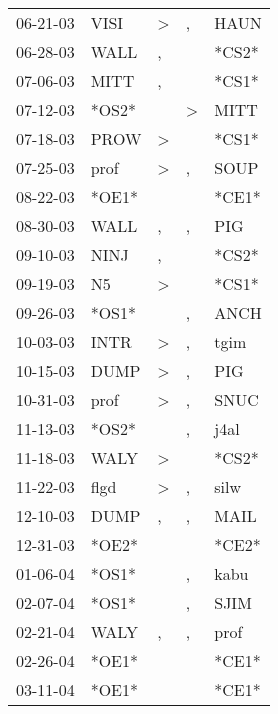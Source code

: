 \begin{supertabular}{lllll}
 06-21-03 &   VISI &     \textgreater &                , &   HAUN \\
 06-28-03 &   WALL &                , &                  &  *CS2* \\
 07-06-03 &   MITT &                , &                  &  *CS1* \\
 07-12-03 &  *OS2* &                  &     \textgreater &   MITT \\
 07-18-03 &   PROW &     \textgreater &                  &  *CS1* \\
 07-25-03 &   prof &     \textgreater &                , &   SOUP \\
 08-22-03 &  *OE1* &                  &                  &  *CE1* \\
 08-30-03 &   WALL &                , &                , &    PIG \\
 09-10-03 &   NINJ &                , &                  &  *CS2* \\
 09-19-03 &     N5 &     \textgreater &                  &  *CS1* \\
 09-26-03 &  *OS1* &                  &                , &   ANCH \\
 10-03-03 &   INTR &     \textgreater &                , &   tgim \\
 10-15-03 &   DUMP &     \textgreater &                , &    PIG \\
 10-31-03 &   prof &     \textgreater &                , &   SNUC \\
 11-13-03 &  *OS2* &                  &                , &   j4al \\
 11-18-03 &   WALY &     \textgreater &                  &  *CS2* \\
 11-22-03 &   flgd &     \textgreater &                , &   silw \\
 12-10-03 &   DUMP &                , &                , &   MAIL \\
 12-31-03 &  *OE2* &                  &                  &  *CE2* \\
 01-06-04 &  *OS1* &                  &                , &   kabu \\
 02-07-04 &  *OS1* &                  &                , &   SJIM \\
 02-21-04 &   WALY &                , &                , &   prof \\
 02-26-04 &  *OE1* &                  &                  &  *CE1* \\
 03-11-04 &  *OE1* &                  &                  &  *CE1* \\

\end{supertabular}
